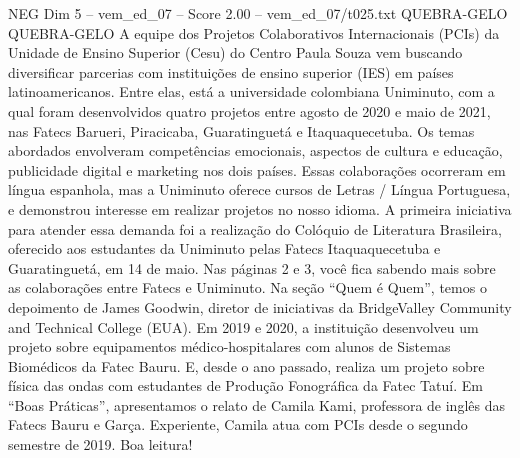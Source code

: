 \begin{textsample}{NEG Dim 5 – vem\_ed\_07 – Score 2.00 – vem\_ed\_07/t025.txt}  \label{ex:f5_neg_018}
QUEBRA-GELO QUEBRA-GELO A equipe dos Projetos Colaborativos Internacionais (PCIs) da Unidade de Ensino Superior (Cesu) do Centro Paula Souza vem buscando diversificar parcerias com instituições de ensino superior (IES) em países latinoamericanos.
Entre elas, está a universidade colombiana Uniminuto, com a qual foram desenvolvidos quatro projetos entre agosto de 2020 e maio de 2021, nas Fatecs Barueri, Piracicaba, Guaratinguetá e Itaquaquecetuba.
Os temas abordados envolveram competências emocionais, aspectos de cultura e educação, publicidade digital e marketing nos dois países.
Essas colaborações ocorreram em língua espanhola, mas a Uniminuto oferece cursos de Letras / Língua Portuguesa, e demonstrou interesse em realizar projetos no nosso idioma.
A primeira iniciativa para atender essa demanda foi a realização do Colóquio de Literatura Brasileira, oferecido aos estudantes da Uniminuto pelas Fatecs Itaquaquecetuba e Guaratinguetá, em 14 de maio.
Nas páginas 2 e 3, você fica sabendo mais sobre as colaborações entre Fatecs e Uniminuto.
Na seção “Quem é Quem”, temos o depoimento de James Goodwin, diretor de iniciativas da BridgeValley Community and Technical College (EUA).
Em 2019 e 2020, a instituição desenvolveu um projeto sobre equipamentos médico-hospitalares com alunos de Sistemas Biomédicos da Fatec Bauru.
E, desde o ano passado, realiza um projeto sobre física das ondas com estudantes de Produção Fonográfica da Fatec Tatuí.
Em “Boas Práticas”, apresentamos o relato de Camila Kami, professora de inglês das Fatecs Bauru e Garça.
Experiente, Camila atua com PCIs desde o segundo semestre de 2019.
Boa leitura!

\end{textsample}
